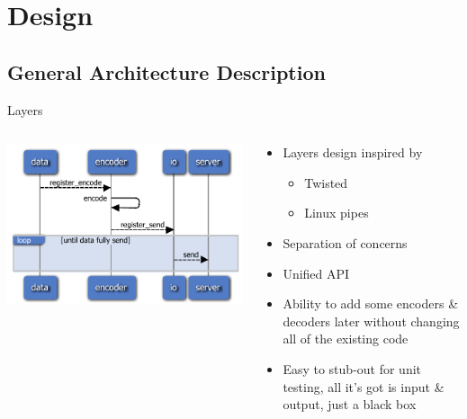 \documentclass{beamer}
\begin{document}
\section{Design}

\subsection{General Architecture Description}

\begin{frame}{Layers}

\begin{columns}
    \begin{column}{0.5\textwidth}
        \centerline{\includegraphics[width=1.0\textwidth]{design-intro.slides/layer.pdf}}
    \end{column}
    \pause
    \begin{column}{0.5\textwidth}
        \begin{itemize}[<+->]
            \item Layers design inspired by
                \begin{itemize}[<+->]
                    \item Twisted
                    \item Linux pipes
                \end{itemize}
            \item Separation of concerns
            \item Unified API
            \item Ability to add some encoders \& decoders later without changing all of the existing code
            \item Easy to stub-out for unit testing, all it's got is input \& output, just a black box
        \end{itemize}
    \end{column}
\end{columns}

\end{frame}
\end{document}
